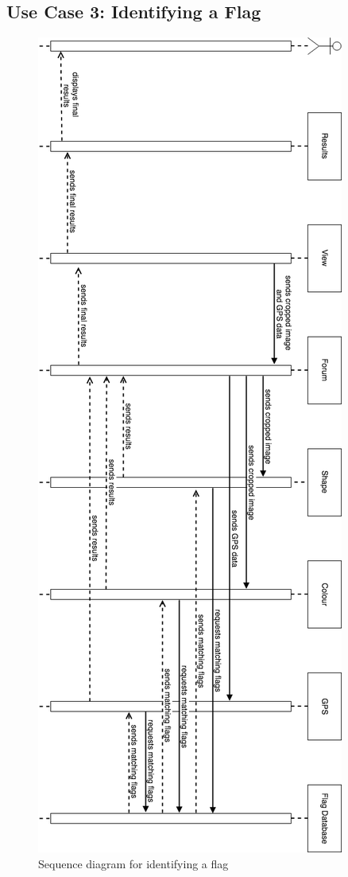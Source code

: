 \documentclass[12pt,fleqn]{article}
\begin{document}
\subsection{Use Case 3: Identifying a Flag}
\begin{figure}[H]
    \centering
    \includegraphics[scale=0.4]{img/SD1.png}
    \caption{Sequence diagram for identifying a flag}
\end{figure}
\end{document}
